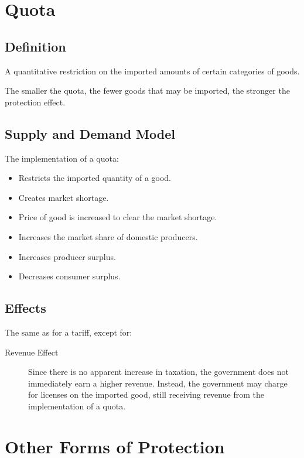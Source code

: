 \documentclass[a4paper,11pt]{report}
\begin{document}
\section{Quota}

\subsection{Definition}

A quantitative restriction on the imported amounts of certain categories of
goods.

The smaller the quota, the fewer goods that may be imported, the stronger the
protection effect.

\subsection{Supply and Demand Model}

The implementation of a quota:

\begin{itemize}
\item Restricts the imported quantity of a good.
\item Creates market shortage.
\item Price of good is increased to clear the market shortage.
\item Increases the market share of domestic producers.
\item Increases producer surplus.
\item Decreases consumer surplus.
\end{itemize}

\subsection{Effects}

The same as for a tariff, except for:

\begin{description}
\item [Revenue Effect] Since there is no apparent increase in taxation,
	the government does not immediately earn a higher revenue. Instead, the
	government may charge for licenses on the imported good, still receiving
	revenue from the implementation of a quota.
\end{description}


\section{Other Forms of Protection}
\end{document}
